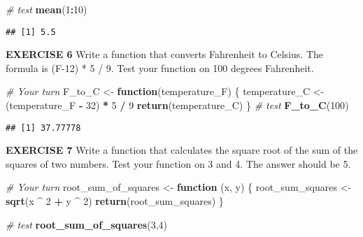 \documentclass[
]{article}
\newenvironment{Shaded}{\begin{snugshade}}{\end{snugshade}}
\newcommand{\CommentTok}[1]{\textcolor[rgb]{0.56,0.35,0.01}{\textit{#1}}}
\newcommand{\ControlFlowTok}[1]{\textcolor[rgb]{0.13,0.29,0.53}{\textbf{#1}}}
\newcommand{\DecValTok}[1]{\textcolor[rgb]{0.00,0.00,0.81}{#1}}
\newcommand{\KeywordTok}[1]{\textcolor[rgb]{0.13,0.29,0.53}{\textbf{#1}}}
\newcommand{\NormalTok}[1]{#1}
\newcommand{\OperatorTok}[1]{\textcolor[rgb]{0.81,0.36,0.00}{\textbf{#1}}}
\newcommand{\StringTok}[1]{\textcolor[rgb]{0.31,0.60,0.02}{#1}}
\begin{document}
\begin{Shaded}
\begin{Highlighting}[]
\CommentTok{# test}
\KeywordTok{mean}\NormalTok{(}\DecValTok{1}\OperatorTok{:}\DecValTok{10}\NormalTok{)}
\end{Highlighting}
\end{Shaded}

\begin{verbatim}
## [1] 5.5
\end{verbatim}

\textbf{EXERCISE 6} Write a function that converts Fahrenheit to
Celsius. The formula is (F-12) * 5 / 9. Test your function on 100
degrees Fahrenheit.

\begin{Shaded}
\begin{Highlighting}[]
\CommentTok{# Your turn}
\NormalTok{F_to_C <-}\StringTok{ }\ControlFlowTok{function}\NormalTok{(temperature_F) \{}
\NormalTok{   temperature_C <-}\StringTok{ }\NormalTok{(temperature_F }\OperatorTok{-}\StringTok{ }\DecValTok{32}\NormalTok{) }\OperatorTok{*}\StringTok{ }\DecValTok{5} \OperatorTok{/}\StringTok{ }\DecValTok{9}
   \KeywordTok{return}\NormalTok{(temperature_C)}
\NormalTok{\}}
\CommentTok{# test }
\KeywordTok{F_to_C}\NormalTok{(}\DecValTok{100}\NormalTok{)}
\end{Highlighting}
\end{Shaded}

\begin{verbatim}
## [1] 37.77778
\end{verbatim}

\textbf{EXERCISE 7} Write a function that calculates the square root of
the sum of the squares of two numbers. Test your function on 3 and 4.
The answer should be 5.

\begin{Shaded}
\begin{Highlighting}[]
\CommentTok{# Your turn}
\NormalTok{root_sum_of_squares <-}\StringTok{ }\ControlFlowTok{function}\NormalTok{ (x, y) \{}
\NormalTok{   root_sum_squares <-}\StringTok{ }\KeywordTok{sqrt}\NormalTok{(x }\OperatorTok{^}\StringTok{ }\DecValTok{2} \OperatorTok{+}\StringTok{ }\NormalTok{y }\OperatorTok{^}\StringTok{ }\DecValTok{2}\NormalTok{)}
   \KeywordTok{return}\NormalTok{(root_sum_squares)}
\NormalTok{\}}

\CommentTok{# test}
\KeywordTok{root_sum_of_squares}\NormalTok{(}\DecValTok{3}\NormalTok{,}\DecValTok{4}\NormalTok{)}
\end{Highlighting}
\end{Shaded}
\end{document}
